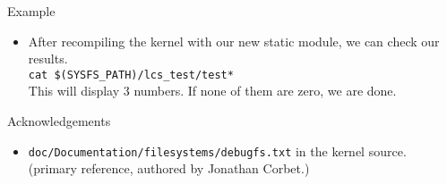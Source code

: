 \documentclass{beamer}
\begin{document}
\begin{frame}{Example}
  \begin{itemize}
  \item After recompiling the kernel with our new static module, we
    can check our results.\\
    \texttt{cat \$(SYSFS\_PATH)/lcs\_test/test*}\\
    This will display 3 numbers. If none of them are zero, we are done.
  \end{itemize}
\end{frame}

\begin{frame}{Acknowledgements}

  \begin{itemize}

  \item \texttt{doc/Documentation/filesystems/debugfs.txt} in the
    kernel source. (primary reference, authored by Jonathan Corbet.)

  \end{itemize}

\end{frame}
\end{document}
